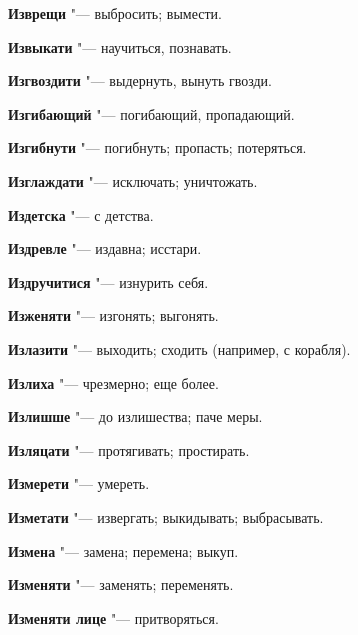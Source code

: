 \begin{mymulticols}{2}
\noindent\textbf{Изврещи} "--- выбросить; вымести. 




\noindent\textbf{Извыкати} "--- научиться, познавать. 




\noindent\textbf{Изгвоздити} "--- выдернуть, вынуть гвозди. 




\noindent\textbf{Изгибающий} "--- погибающий, пропадающий. 




\noindent\textbf{Изгибнути} "--- погибнуть; пропасть; потеряться. 




\noindent\textbf{Изглаждати} "--- исключать; уничтожать. 




\noindent\textbf{Издетска} "--- с детства. 




\noindent\textbf{Издревле} "--- издавна; исстари. 




\noindent\textbf{Издручитися} "--- изнурить себя. 




\noindent\textbf{Изженяти} "--- изгонять; выгонять. 




\noindent\textbf{Излазити} "--- выходить; сходить (например, с корабля). 




\noindent\textbf{Излиха} "--- чрезмерно; еще более. 




\noindent\textbf{Излишше} "--- до излишества; паче меры. 




\noindent\textbf{Изляцати} "--- протягивать; простирать. 




\noindent\textbf{Измерети} "--- умереть. 




\noindent\textbf{Изметати} "--- извергать; выкидывать; выбрасывать. 




\noindent\textbf{Измена} "--- замена; перемена; выкуп. 




\noindent\textbf{Изменяти} "--- заменять; переменять. 




\noindent\textbf{Изменяти лице} "--- притворяться. 





\end{mymulticols}
